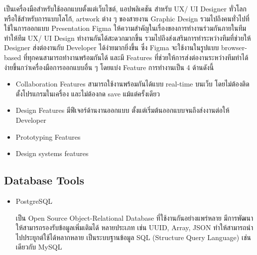\documentclass[12pt,oneside,openright,a4paper]{cpe-thai-project}
\begin{document}
\begin{itemize}
      \hspace{1cm}เป็นเครื่องมือสำหรับใช้ออกแบบตั้งแต่เว็บไซต์, แอปพลิเคชัน สำหรับ UX/ UI Designer ทั่วโลก 
      หรือใช้สำหรับการแบบโลโก้, artwork ต่าง ๆ ของสายงาน Graphic Design รวมไปถึงคนทั่วไปที่ใช้ในการออกแบบ Presentation 
      Figma ให้ความสำคัญในเรื่องของการทำงานร่วมกันภายในทีม ทำให้ทีม UX/ UI Design ทำงานกันได้สะดวกมากขึ้น 
      รวมไปถึงส่งเสริมการทำระหว่างทีมที่ช่วยให้ Designer ส่งต่องานกับ Developer ได้ง่ายมากยิ่งขึ้น 
      ซึ่ง Figma จะใช้งานในรูปแบบ browser-based ที่ทุกคนสามารถทำงานพร้อมกันได้ 
      และมี Features ที่ช่วยให้การส่งต่องานระหว่างทีมทำได้ง่ายขึ้นกว่าเครื่องมือการออกแบบอื่น ๆ 
      โดยแบ่ง Feature การทำงานเป็น 4 ด้านดังนี้ \cite{figma}
        \begin{itemize}
          \item Collaboration Features
          \newline สามารถใช้งานพร้อมกันได้แบบ real-time บนเว็บ โดยไม่ต้องติดตั้งโปรแกรมในเครื่อง และไม่ต้องกด save แม้แต่ครั้งเดียว
          \item Design Features
          \newline มีฟีเจอร์ด้านงานออกแบบ ตั้งแต่เริ่มต้นออกแบบจนถึงส่งงานต่อให้ Developer
          \item Prototyping Features
          \item Design systems features
        \end{itemize}
    \end{itemize}
  \subsection{Database Tools}
    \begin{itemize}
      \item PostgreSQL
      
      \hspace{1cm}เป็น Open Source Object-Relational Database ที่ใช้งานกันอย่างแพร่หลาย มีการพัฒนาให้สามารถรองรับข้อมูลเพิ่มเติมได้
      หลายประเภท เช่น UUID, Array, JSON ทำให้สามารถนำไปประยุุกต์ใช้ได้หลากหลาย เป็นระบบฐานข้อมูล SQL (Structure Query Language)
      เช่นเดียวกับ MySQL  \cite{postgresql}
    \end{itemize}
\end{document}
